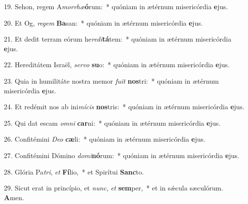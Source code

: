 19. Sehon, regem A\textit{mor}\textit{rhæ}\textbf{ó}rum:~*  quóniam in ætérnum misericórdia \textbf{e}jus.\

20. Et Og, \textit{re}\textit{gem} \textbf{Ba}san:~*  quóniam in ætérnum misericórdia \textbf{e}jus.\

21. Et dedit terram eórum he\textit{re}\textit{di}\textbf{tá}tem:~*  quóniam in ætérnum misericórdia \textbf{e}jus.\

22. Hereditátem Israël, \textit{ser}\textit{vo} \textbf{su}o:~*  quóniam in ætérnum misericórdia \textbf{e}jus.\

23. Quia in humilitáte nostra memor \textit{fu}\textit{it} \textbf{nos}tri:~*  quóniam in ætérnum misericórdia \textbf{e}jus.\

24. Et redémit nos ab ini\textit{mí}\textit{cis} \textbf{nos}tris:~*  quóniam in ætérnum misericórdia \textbf{e}jus.\

25. Qui dat escam \textit{om}\textit{ni} \textbf{car}ni:~*  quóniam in ætérnum misericórdia \textbf{e}jus.\

26. Confitémini \textit{De}\textit{o} \textbf{cæ}li:~*  quóniam in ætérnum misericórdia \textbf{e}jus.\

27. Confitémini Dómino \textit{do}\textit{mi}\textbf{nó}rum:~*  quóniam in ætérnum misericórdia \textbf{e}jus.\

28. Glória Pa\textit{tri}, \textit{et} \textbf{Fí}lio,~*  et Spirítui \textbf{Sanc}to.\

29. Sicut erat in princípio, et \textit{nunc}, \textit{et} \textbf{sem}per,~*  et in sǽcula sæculórum. \textbf{A}men.\

